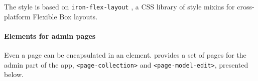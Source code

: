 The style is based on \texttt{iron-flex-layout} \cite{iron-elements}, a CSS library of style mixins for cross-platform Flexible Box layouts.

\paragraph{Elements for admin pages}

Even a page can be encapsulated in an element.  provides a set of pages for the admin part of the app, \texttt{<page-collection>} and \texttt{<page-model-edit>}, presented below.


